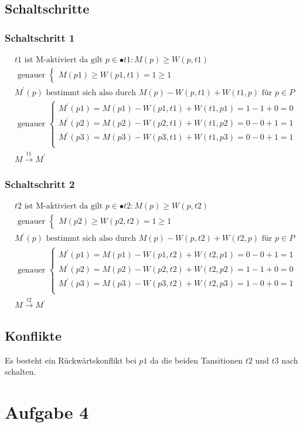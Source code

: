 \documentclass[10pt]{scrartcl}
\begin{document}
	\subsection{Schaltschritte}
	
	\subsubsection{Schaltschritt 1}	
		\begin{align}	
			&t1 \text{ ist M-aktiviert da gilt } p \in \bullet t1:M(p) \geq W(p,t1)\\
			&\text{ genauer }\begin{cases}
				M(p1) \geq W(p1,t1) = 1 \geq 1	
			\end{cases}\\
			&M^{'}(p) \text{ bestimmt sich also durch } M(p) - W(p,t1) + W(t1,p) \text{ für }  p \in P\\
			&\text{ genauer }\begin{cases}
				M^{'}(p1) = M(p1) - W(p1,t1) + W(t1,p1) = 1 - 1 + 0 = 0\\
				M^{'}(p2) = M(p2) - W(p2,t1) + W(t1,p2) = 0 - 0 + 1 = 1\\ 
				M^{'}(p3) = M(p3) - W(p3,t1) + W(t1,p3) = 0 - 0 + 1 = 1\\ 
			\end{cases}\\
			&M\overset{t1}{\rightarrow}M^{'}			
		\end{align}
		
	\subsubsection{Schaltschritt 2}
		\begin{align}	
			&t2 \text{ ist M-aktiviert da gilt } p \in \bullet t2:M(p) \geq W(p,t2)\\
			&\text{ genauer }\begin{cases}
				M(p2) \geq W(p2,t2) = 1 \geq 1	
			\end{cases}\\
			&M^{'}(p) \text{ bestimmt sich also durch } M(p) - W(p,t2) + W(t2,p) \text{ für }  p \in P\\
			&\text{ genauer }\begin{cases}
				M^{'}(p1) = M(p1) - W(p1,t2) + W(t2,p1) = 0 - 0 + 1 = 1\\
				M^{'}(p2) = M(p2) - W(p2,t2) + W(t2,p2) = 1 - 1 + 0 = 0\\ 
				M^{'}(p3) = M(p3) - W(p3,t2) + W(t2,p3) = 1 - 0 + 0 = 1\\ 
			\end{cases}\\
			&M\overset{t2}{\rightarrow}M^{'}			
		\end{align}
		
	\subsection{Konflikte}
	Es besteht ein Rückwärtskonflikt bei $p1$ da die beiden Tansitionen $t2$ und $t3$ nach schalten.
	
\section{Aufgabe 4}
\end{document}
